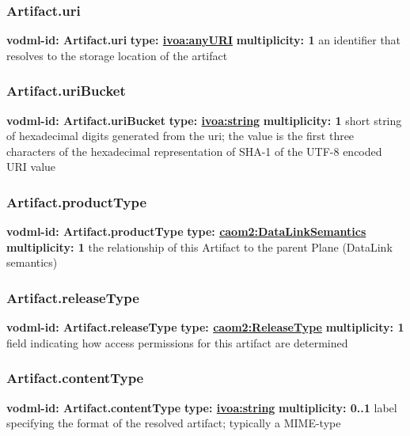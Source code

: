     \subsubsection{Artifact.uri}
      \textbf{vodml-id: Artifact.uri} \newline
      \textbf{type: \hyperref[sect:ivoa]{ivoa:anyURI}} \newline
      \textbf{multiplicity: 1} \newline
      an identifier that resolves to the storage location of the artifact

    \subsubsection{Artifact.uriBucket}
      \textbf{vodml-id: Artifact.uriBucket} \newline
      \textbf{type: \hyperref[sect:ivoa]{ivoa:string}} \newline
      \textbf{multiplicity: 1} \newline
      short string of hexadecimal digits generated from the uri; the value is the first three characters of the hexadecimal representation of SHA-1 of the UTF-8 encoded URI value

    \subsubsection{Artifact.productType}
      \textbf{vodml-id: Artifact.productType} \newline
      \textbf{type: \hyperref[sect:DataLinkSemantics]{caom2:DataLinkSemantics}} \newline
      \textbf{multiplicity: 1} \newline
      the relationship of this Artifact to the parent Plane (DataLink semantics)

    \subsubsection{Artifact.releaseType}
      \textbf{vodml-id: Artifact.releaseType} \newline
      \textbf{type: \hyperref[sect:ReleaseType]{caom2:ReleaseType}} \newline
      \textbf{multiplicity: 1} \newline
      field indicating how access permissions for this artifact are determined

    \subsubsection{Artifact.contentType}
      \textbf{vodml-id: Artifact.contentType} \newline
      \textbf{type: \hyperref[sect:ivoa]{ivoa:string}} \newline
      \textbf{multiplicity: 0..1} \newline
      label specifying the format of the resolved artifact; typically a MIME-type

